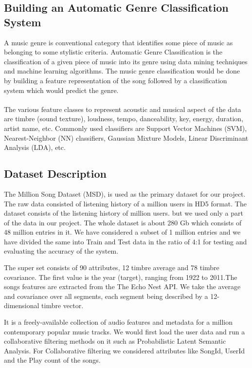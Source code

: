 \documentclass{sig-alternate-05-2015}
\begin{document}
\subsection{Building an Automatic Genre Classification System}
A music genre is conventional category that identifies some piece of music as belonging to some stylistic criteria. Automatic Genre Classification is the classification of a given piece of music into its genre using data mining techniques and machine learning algorithms. The music genre classification would be done by building a feature representation of the song followed by a classification system which would predict the genre.\\\\
The various feature classes to represent acoustic and musical aspect of the data are timbre (sound texture), loudness, tempo, danceability, key, energy, duration, artist name, etc. Commonly used classifiers are Support Vector Machines (SVM), Nearest-Neighbor (NN) classifiers, Gaussian Mixture Models, Linear Discriminant Analysis (LDA), etc.\\

\subsection{Dataset Description}
The Million Song Dataset (MSD), is used as the primary dataset for our project. The raw data consisted of listening history of a million users in HD5 format. The dataset consists of the listening history of million users. but we used only a part of the data in our project. The whole dataset is about 280 Gb which consists of 48 million entries in it. We have considered a subset of 1 million entries and we have divided the same into Train and Test data in the ratio of 4:1 for testing and evaluating the accuracy of the system.

The super set consists of 90 attributes, 12 timbre average and 78 timbre covariance. The first value is the year (target), ranging from 1922 to 2011.The songs features are extracted from the The Echo Nest API. We take the average and covariance over all segments, each segment being described by a 12-dimensional timbre vector.

It is a freely-available collection of audio features and metadata for a million contemporary popular music tracks. We would first load the user data and run a collaborative filtering methods on it such as Probabilistic Latent Semantic Analysis. For Collaborative filtering we considered attributes like SongId, UserId and the Play count of the songs.
\end{document}
